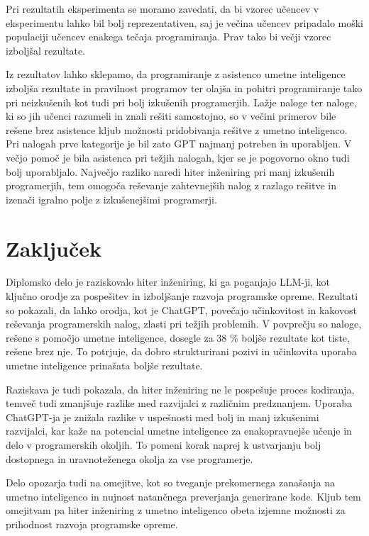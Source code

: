 \documentclass[a4paper,12pt,openright]{book}
\begin{document}
Pri rezultatih eksperimenta se moramo zavedati, da bi vzorec učencev v eksperimentu lahko bil bolj reprezentativen, saj je večina učencev pripadalo moški populaciji učencev enakega tečaja programiranja. Prav tako bi večji vzorec izboljšal rezultate.

Iz rezultatov lahko sklepamo, da programiranje z asistenco umetne inteligence izboljša rezultate in pravilnost programov ter olajša in pohitri programiranje tako pri neizkušenih kot tudi pri bolj izkušenih programerjih. Lažje naloge ter naloge, ki so jih učenci razumeli in znali rešiti samostojno, so v večini primerov bile rešene brez asistence kljub možnosti pridobivanja rešitve z umetno inteligenco. Pri nalogah prve kategorije je bil zato GPT najmanj potreben in uporabljen. V večjo pomoč je bila asistenca pri težjih nalogah, kjer se je pogovorno okno tudi bolj uporabljalo. Največjo razliko naredi hiter inženiring pri manj izkušenih programerjih, tem omogoča reševanje zahtevnejših nalog z razlago rešitve in izenači igralno polje z izkušenejšimi programerji.

\pagebreak

\section{Zaključek}
Diplomsko delo je raziskovalo hiter inženiring, ki ga poganjajo LLM-ji, kot ključno orodje za pospešitev in izboljšanje razvoja programske opreme. Rezultati so pokazali, da lahko orodja, kot je ChatGPT, povečajo učinkovitost in kakovost reševanja programerskih nalog, zlasti pri težjih problemih. V povprečju so naloge, rešene s pomočjo umetne inteligence, dosegle za 38 \% boljše rezultate kot tiste, rešene brez nje. To potrjuje, da dobro strukturirani pozivi in učinkovita uporaba umetne inteligence prinašata boljše rezultate.

Raziskava je tudi pokazala, da hiter inženiring ne le pospešuje proces kodiranja, temveč tudi zmanjšuje razlike med razvijalci z različnim predznanjem. Uporaba ChatGPT-ja je znižala razlike v uspešnosti med bolj in manj izkušenimi razvijalci, kar kaže na potencial umetne inteligence za enakopravnejše učenje in delo v programerskih okoljih. To pomeni korak naprej k ustvarjanju bolj dostopnega in uravnoteženega okolja za vse programerje.

Delo opozarja tudi na omejitve, kot so tveganje prekomernega zanašanja na umetno inteligenco in nujnost natančnega preverjanja generirane kode. Kljub tem omejitvam pa hiter inženiring z umetno inteligenco obeta izjemne možnosti za prihodnost razvoja programske opreme.
\end{document}
